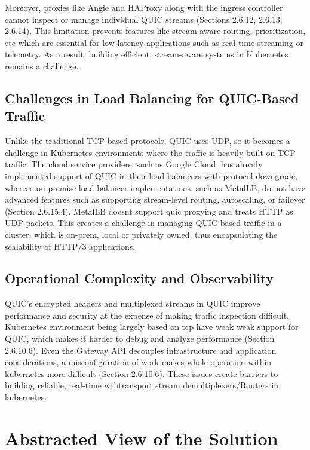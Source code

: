 Moreover, proxies like Angie and HAProxy along with the ingress controller cannot inspect or manage individual QUIC streams (Sections 2.6.12, 2.6.13, 2.6.14). This limitation prevents features like stream-aware routing, prioritization, etc which are essential for low-latency applications such as real-time streaming or telemetry. As a result, building efficient, stream-aware systems in Kubernetes remains a challenge.

\subsection{Challenges in Load Balancing for QUIC-Based Traffic}
Unlike the traditional TCP-based protocols, QUIC uses UDP, so it becomes a challenge in Kubernetes environments where the traffic is heavily built on TCP traffic. The cloud service providers, such as Google Cloud, has already implemented support of QUIC in their load balancers with protocol downgrade, whereas on-premise load balancer implementations, such as MetalLB, do not have advanced features such as supporting stream-level routing, autoscaling, or failover (Section 2.6.15.4). MetalLB doesnt support quic proxying and treats HTTP as UDP packets. This creates a challenge in managing QUIC-based traffic in a cluster, which is on-prem, local or privately owned, thus encapsulating the scalability of HTTP/3 applications.


\subsection{Operational Complexity and Observability}

QUIC’s encrypted headers and multiplexed streams in QUIC improve performance and security at the expense of making traffic inspection difficult. Kubernetes environment being largely based on tcp have weak weak support for QUIC, which makes it harder to debug and analyze performance (Section 2.6.10.6). Even the Gateway API decouples infrastructure and application considerations, a misconfiguration of work makes whole operation within kubernetes more difficult (Section 2.6.10.6). These issues create barriers to building reliable, real-time webtransport stream demultiplexers/Routers in kubernetes.

\section{Abstracted View of the Solution}


